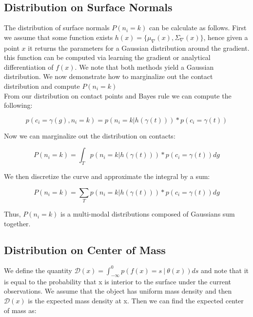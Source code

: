 \documentclass[letterpaper, 10 pt, conference]{ieeeconf}  %
\begin{document}
\subsection{Distribution on Surface Normals} 
The distribution of surface normals $P(n_i = k)$ can be calculate as follows.
First we assume that some function exists $h(x) = \lbrace \mu_{\nabla}(x), \Sigma_{\nabla}(x) \rbrace$, hence given a point $x$ it returns the parameters for a Gaussian distribution around the gradient.
this function can be computed via learning the gradient \cite{gradient} or analytical differentiation of $f(x)$.
We note that both methods yield a Gaussian distribution.
We now demonstrate how to marginalize out the contact distribution and compute $P(n_i = k)$\\

From our distribution on contact points and Bayes rule we can compute the following: 

\begin{equation}
p(c_i = \gamma(g), n_i = k) = p(n_i = k | h(\gamma(t)))*p(c_i = \gamma(t))
\end{equation}

Now we can marginalize out the distribution on contacts:

\begin{equation}
P(n_i = k) = \int_T  p(n_i = k | h(\gamma(t)))*p(c_i = \gamma(t)) dg
\end{equation}

We then discretize the curve and approximate the integral by a sum: 

\begin{equation}
P(n_i = k) = \sum_T  p(n_i = k | h(\gamma(t)))*p(c_i = \gamma(t)) dg
\end{equation}


Thus, $P(n_i = k)$ is a multi-modal distributions composed of Gaussians sum together. 

\subsection{Distribution on Center of Mass} 

We define the quantity $\mathcal{D}(x) = \int_{-\infty}^{0} p(f(x) =  s \ | \ \theta(x)) ds$ and note that it is equal to the probability that x is interior to the surface under the current observations.
We assume that the object has uniform mass density and then $\mathcal{D}(x)$ is the expected mass density at x.
Then we can find the expected center of mass as:
\end{document}
